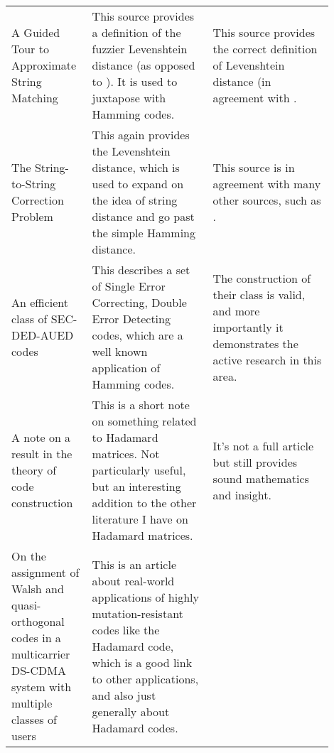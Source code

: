 \documentclass[a4paper,11pt]{article}
\begin{document}
\begin{center}
{\begin{longtable}{p{0.2\linewidth} p{0.35\linewidth} p{0.35\linewidth}}
    \\

    A Guided Tour to Approximate String Matching \cite{Levenshtein2001Navarro} &

    This source provides a definition of the fuzzier Levenshtein distance (as
    opposed to \cite{Codes1950Hamming}). It is used to juxtapose with Hamming
    codes. &

    This source provides the correct definition of Levenshtein distance (in
    agreement with \cite{StringtoString1974Wagner}.

    \\

    The String-to-String Correction Problem \cite{StringtoString1974Wagner} &

    This again provides the Levenshtein distance, which is used to expand on the
    idea of string distance and go past the simple Hamming distance. &

    This source is in agreement with many other sources, such as
    \cite{Levenshtein2001Navarro}.

    \\

    An efficient class of SEC-DED-AUED codes
    \cite{HammingCodes1997Battacharryya} &

    This describes a set of Single Error Correcting, Double Error Detecting
    codes, which are a well known application of Hamming codes. &

    The construction of their class is valid, and more importantly it
    demonstrates the active research in this area.

    \\

    A note on a result in the theory of code construction
    \cite{HadamardNote1959Bose} &

    This is a short note on something related to Hadamard matrices. Not
    particularly useful, but an interesting addition to the other literature I
    have on Hadamard matrices. &

    It's not a full article but still provides sound mathematics and insight.

    \\

    On the assignment of Walsh and quasi-orthogonal codes in a multicarrier
    DS-CDMA system with multiple classes of users
    \cite{OrthogonalCodes2002Amadei} &

    This is an article about real-world applications of highly
    mutation-resistant codes like the Hadamard code, which is a good link to
    other applications, and also just generally about Hadamard codes. &


\end{longtable}}
\end{center}
\end{document}
